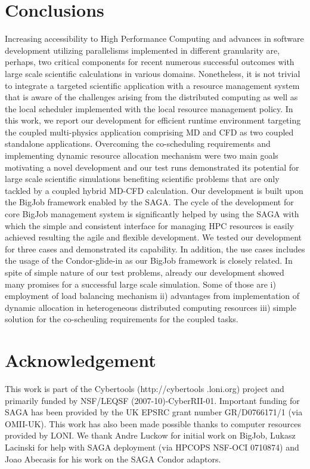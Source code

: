 \documentclass[conference,final]{IEEEtran}
\begin{document}
\section{Conclusions}

Increasing accessibility to High Performance Computing and advances in software development utilizing parallelisms implemented in different granularity are, perhaps, two critical components for recent numerous successful outcomes with large scale scientific calculations in various domains. Nonetheless, it is not trivial to integrate a targeted scientific application with a resource management system that is aware of the challenges arising from the distributed computing as well as the local scheduler implemented with the local resource management policy.  
In this work, we report our development for efficient runtime environment targeting the coupled multi-physics application comprising MD and CFD as two coupled standalone applications.  Overcoming the co-scheduling requirements and implementing dynamic resource allocation mechanism were two main goals motivating a novel development and our test runs demonstrated its potential for large scale scientific simulations benefiting scientific problems that are only tackled by a coupled hybrid MD-CFD calculation.
Our development is built upon the BigJob framework enabled by the SAGA.  The cycle of the development for core BigJob management system is significantly helped by using the SAGA with which the simple and consistent interface for managing HPC resources is easily achieved resulting the agile and flexible development.
We tested our development for three cases and demonstrated its capability.  In addition, the use cases includes the usage of the Condor-glide-in as our BigJob framework is closely related.  In spite of simple nature of our test problems, already our development showed many promises for a successful large scale simulation.  Some of those are i) employment of load balancing mechanism ii) advantages from implementation of dynamic allocation in heterogeneous distributed computing resources iii) simple solution for the co-scheuling requirements for the coupled tasks.



\section*{Acknowledgement}
This work is part of the Cybertools (http://cybertools .loni.org) project and primarily 
funded by NSF/LEQSF (2007-10)-CyberRII-01. Important funding for SAGA has been provided 
by the UK EPSRC grant number GR/D0766171/1 (via OMII-UK). This work has also been made 
possible thanks to computer resources provided by LONI. We thank Andre Luckow for 
initial work on BigJob, Lukasz Lacinski for help with SAGA deployment (via HPCOPS NSF-OCI 
0710874) and Joao Abecasis for his work on the SAGA Condor adaptors.

\nocite{ex1,ex2}
%


\end{document}
